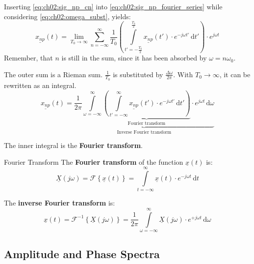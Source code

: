\begin{refsection}
Inserting \eqref{eq:ch02:sig_np_cn} into \eqref{eq:ch02:sig_np_fourier_series} while considering \eqref{eq:ch02:omega_subst}, yields:
\begin{equation}
	\underline{x_{np}}(t) = \lim\limits_{T_0 \rightarrow \infty} \sum\limits_{n = -\infty}^{\infty} \frac{1}{T_0} \left( \int\limits_{t' = -\frac{T_0}{2}}^{\frac{T_0}{2}} \underline{x_{np}}(t') \cdot e^{-j \omega t'} \, \mathrm{d} t' \right) \cdot e^{j \omega t}
\end{equation}
Remember, that $n$ is still in the sum, since it has been absorbed by $\omega = n \omega_0$.

The outer sum is a Rieman sum. $\frac{1}{T_0}$ is substituted by $\frac{\Delta \omega}{2 \pi}$. With $T_0 \rightarrow \infty$, it can be rewritten as an integral.
\begin{equation}
	\underline{x_{np}}(t) = \underbrace{\frac{1}{2 \pi} \int\limits_{\omega = -\infty}^{\infty} \underbrace{\left( \int\limits_{t' = -\infty}^{\infty} \underline{x_{np}}(t') \cdot e^{-j \omega t'} \, \mathrm{d} t' \right)}_{\text{Fourier transform}} \cdot e^{j \omega t} \, \mathrm{d} \omega}_{\text{Inverse Fourier transform}}
\end{equation}

The inner integral is the  \textbf{Fourier transform}. 

\begin{definition}{Fourier Transform}
	The  \textbf{Fourier transform} of the function $\underline{x}(t)$ is:
	\begin{equation}
		\underline{X}(j \omega) = \mathcal{F} \left\{\underline{x}(t)\right\} = \int\limits_{t = -\infty}^{\infty} \underline{x}(t) \cdot e^{-j \omega t} \, \mathrm{d} t
	\end{equation}
	
	The  \textbf{inverse Fourier transform} is:
	\begin{equation}
		\underline{x}(t) = \mathcal{F}^{-1} \left\{\underline{X}(j \omega)\right\} = \frac{1}{2 \pi} \int\limits_{\omega = -\infty}^{\infty} \underline{X}(j \omega) \cdot e^{+j \omega t} \, \mathrm{d} \omega
	\end{equation}
\end{definition}

\subsection{Amplitude and Phase Spectra}


\end{refsection}
